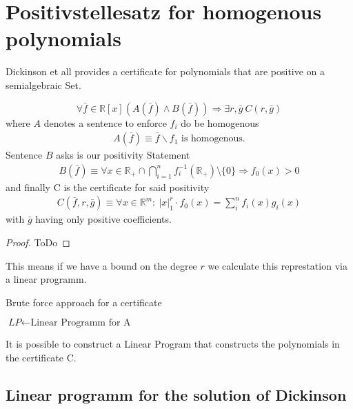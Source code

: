 \documentclass[./main.tex]{subfiles}
\begin{document}
\section{Positivstellesatz for homogenous polynomials}

Dickinson et all provides a certificate for polynomials that are positive on a semialgebraic Set.
\begin{thm}
\label{Dickinson}
\begin{equation}
\forall \bar{f} \in \mathbb{R}[x] \left( A(\bar{f}) \wedge B(\bar{f}) \right) \Rightarrow \exists r, \bar{g} \  C(r,\bar{g})
\end{equation}
where $A$ denotes a sentence to enforce $f_i$ do be homogenous
\begin{align*}
A(\bar{f}) \equiv \bar f \backslash f_1 \text{ is homogenous}.
\end{align*}
Sentence $B$ asks is our positivity Statement
\begin{align*}
B(\bar f ) \equiv \forall x \in \mathbb{R}_+\cap \bigcap_{i=1}^n f_i^{-1}(\mathbb R_+) \setminus \lbrace 0 \rbrace \Rightarrow f_0(x) >0 
\end{align*}
and finally C is the certificate for said positivity
\begin{align*}
C(\bar f ,r, \bar g) \equiv \forall x \in \mathbb{R}^m : \ \vert x \vert_1^r \cdot f_0(x) = \sum_i^n f_i(x)g_i(x) 
\end{align*}
with $\bar g$ having only positive coefficients.
\begin{proof}
ToDo
\end{proof}
\end{thm}
This means if we have a bound on the degree $r$ we calculate this represtation via a linear programm.

\begin{algorithm}
\caption{Brute force approach for a certificate}\label{euclid}
\begin{algorithmic}[1]
\State $\textit{LP} \gets \text{Linear Programm for A}$\\
 {
}
\end{algorithmic}
\end{algorithm}


It is possible to construct a Linear Program that constructs the polynomials in the certificate C.
\subsection{Linear programm for the solution of Dickinson}
\end{document}
